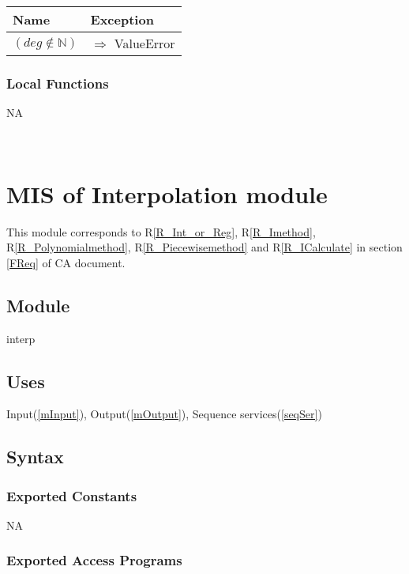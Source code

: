 \documentclass[12pt, titlepage]{article}
\begin{document}
\begin{tabular}{p{12cm} p{4.75cm}}
	
	\toprule
	\textbf{Name}&\textbf{Exception}\\
	\midrule
	
	
	$ (deg \notin \mathbb{N})$ & $\Rightarrow$ ValueError\\

	
	\bottomrule
\end{tabular}


\subsubsection{Local Functions}

NA




~\newpage

\section{MIS of Interpolation module} \label{mInterp}

This module corresponds to R\ref{R_Int_or_Reg}, R\ref{R_Imethod}, 
R\ref{R_Polynomialmethod}, R\ref{R_Piecewisemethod} and R\ref{R_ICalculate}
in section \ref{FReq} of CA document.


\subsection{Module}

interp

\subsection{Uses}

Input(\ref{mInput}), Output(\ref{mOutput}), Sequence services(\ref{seqSer})


\subsection{Syntax}

\subsubsection{Exported Constants}


NA

\subsubsection{Exported Access Programs}
\end{document}
